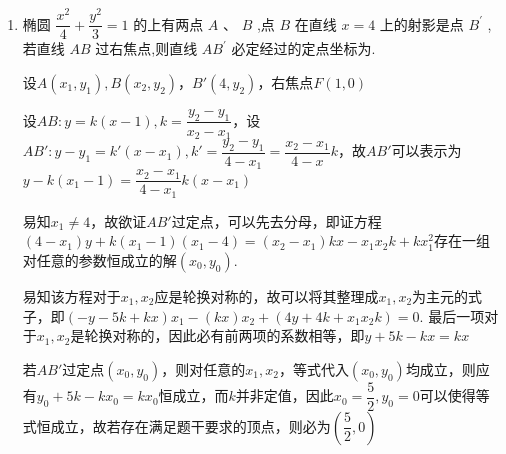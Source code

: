 \begin{enumerate}
\begin{jieda}
\begin{enumerate}
\begin{dingautolist}{172}
                根据韦达定理有$\left\{\begin{array}{l}
                     {x}_{1} + {x}_{2} = \dfrac{4{k}^{2}t}{1 + 2{k}^{2}}  \\
                     {x}_{1}{x}_{2} = \dfrac{2{k}^{2}{t}^{2} - 4}{1 + 2{k}^{2}}
                \end{array}\right.$
                
                故有$\left( {1 + {k}^{2}}\right) \left( {2{k}^{2}{t}^{2} - 4}\right)  - \left( {2 + {k}^{2}t}\right)  \cdot  4{k}^{2}t + \left( {4 + {k}^{2}{t}^{2}}\right) \left( {1 + 2{k}^{2}}\right)  = 0$ ,
                
                整理得 ${k}^{2}\left( {3{t}^{2} - {8t} + 4}\right)  = 0$ ,因为 $k$ 不恒为 0,
                
                故解得 $t = \dfrac{2}{3}$ 或 $t = 2$ (舍)
            \end{dingautolist}
            综上，当 $t = \dfrac{2}{3}$ 时，以 ${AB}$ 为直径的圆恒过点 $M$ .
        \end{enumerate}
    \end{jieda}
    
    \item 椭圆 $\dfrac{x^2}{4} + \dfrac{{y}^{2}}{3} = 1$ 的上有两点 $A\text{ 、 }B$ ,点 $B$ 在直线 $x = 4$ 上的射影是点 ${B}^{\prime }$ ,若直线 ${AB}$ 过右焦点,则直线 $A{B}^{\prime }$ 必定经过的定点坐标为.
    \begin{jieda}
        设$A(x_1, y_1), B(x_2, y_2)， B'\left(4, y_2\right)$，右焦点$F(1, 0)$

        设$AB: y = k(x-1), k = \dfrac{y_2 - y_1}{x_2 - x_1}$，设$AB': y - y_1 = k'(x - x_1), k' = \dfrac{y_2-y_1}{4 - x_1} = \dfrac{x_2-x_1}{4 - x}k$，故$AB'$可以表示为$y - k(x_1-1) = \dfrac{x_2-x_1}{4 - x_1}k(x-x_1)$

        易知$x_1 \neq 4$，故欲证$AB'$过定点，可以先去分母，即证方程$\left(4 - x_1\right)y + k(x_1-1)\left(x_1-4\right) = (x_2 - x_1)kx -x_1x_2k + kx_1^2$存在一组对任意的参数恒成立的解$(x_0, y_0)$.

        易知该方程对于$x_1, x_2$应是轮换对称的，故可以将其整理成$x_1, x_2$为主元的式子，即$\left(-y -5k+kx\right)x_1  - (kx)x_2 + \left(4y+4k+x_1x_2k\right) = 0$. 最后一项对于$x_1, x_2$是轮换对称的，因此必有前两项的系数相等，即$y + 5k - kx = kx$

        若$AB'$过定点$(x_0, y_0)$，则对任意的$x_1, x_2$，等式代入$(x_0, y_0)$均成立，则应有$y_0 + 5k - kx_0 = kx_0$恒成立，而$k$并非定值，因此$x_0 = \dfrac{5}{2}, y_0 = 0$可以使得等式恒成立，故若存在满足题干要求的顶点，则必为$\left(\dfrac{5}{2}, 0\right)$


\end{jieda}
\end{enumerate}
